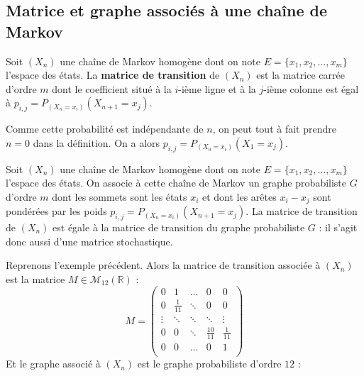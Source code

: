 	\subsection{Matrice et graphe associés à une chaîne de Markov}

	\begin{formula}
		Soit $(X_n)$ une chaîne de Markov homogène dont on note $E = \{x_1, x_2, \dots, x_m\}$ l'espace des états. La \textbf{matrice de transition} de $(X_n)$ est la matrice carrée d'ordre $m$ dont le coefficient situé à la $i$-ième ligne et à la $j$-ième colonne est égal à $p_{i,j} = P_{(X_n = x_i)}(X_{n+1} = x_j)$.
	\end{formula}

	\begin{tip}
		Comme cette probabilité est indépendante de $n$, on peut tout à fait prendre $n = 0$ dans la définition. On a alors $p_{i,j} = P_{(X_0 = x_i)}(X_1 = x_j)$.
	\end{tip}

	\begin{formula}
		Soit $(X_n)$ une chaîne de Markov homogène dont on note $E = \{x_1, x_2, \dots, x_m\}$ l'espace des états. On associe à cette chaîne de Markov un graphe probabiliste $G$ d'ordre $m$ dont les sommets sont les états $x_i$ et dont les arêtes $x_i - x_j$ sont pondérées par les poids $p_{i,j} = P_{(X_n = x_i)}(X_{n+1} = x_j)$.
		\newpar
		La matrice de transition de $(X_n)$ est égale à la matrice de transition du graphe probabiliste $G$ : il s'agit donc aussi d'une matrice stochastique.
	\end{formula}

	\begin{tip}[Exemple]
		\contentwidth[big]
		Reprenons l'exemple précédent. Alors la matrice de transition associée à $(X_n)$ est la matrice $M \in \mathcal{M}_{12}(\mathbb{R})$ :
		\begingroup
		\renewcommand*{\arraystretch}{1.2}
		\[ M = \begin{pmatrix} 0 & 1 & \dots & 0 & 0 \\ 0 & \frac{1}{11} & \ddots & 0 & 0 \\
		\vdots & \ddots & \ddots & \ddots & \vdots \\ 0 & 0 & \ddots & \frac{10}{11} & \frac{1}{11} \\
		0 & 0 & \dots & 0 & 1 \\ \end{pmatrix} \]
		\endgroup
		Et le graphe associé à $(X_n)$ est le graphe probabiliste d'ordre $12$ :
	\end{tip}

